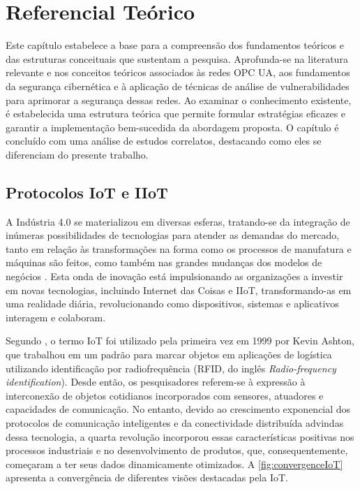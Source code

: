 \chapter{Referencial Teórico} \label{cap:refTeorico}

Este capítulo estabelece a base para a compreensão dos fundamentos teóricos e das estruturas conceituais que sustentam a pesquisa. Aprofunda-se na literatura relevante e nos conceitos teóricos associados às redes OPC UA, aos fundamentos da segurança cibernética e à aplicação de técnicas de análise de vulnerabilidades para aprimorar a segurança dessas redes. Ao examinar o conhecimento existente, é estabelecida uma estrutura teórica que permite formular estratégias eficazes e garantir a implementação bem-sucedida da abordagem proposta. O capítulo é concluído com uma análise de estudos correlatos, destacando como eles se diferenciam do presente trabalho.    

\section{Protocolos IoT e IIoT} \label{sec:protocolos}
    
    A Indústria 4.0 se materializou em diversas esferas, tratando-se da integração de inúmeras possibilidades de tecnologias para atender as demandas do mercado, tanto em relação às transformações na forma como os processos de manufatura e máquinas são feitos, como também nas grandes mudanças dos modelos de negócios \cite{trotta2018}. Esta onda de inovação está impulsionando as organizações a investir em novas tecnologias, incluindo Internet das Coisas e IIoT, transformando-as em uma realidade diária, revolucionando como dispositivos, sistemas e aplicativos interagem e colaboram.
    
    Segundo , o termo IoT foi utilizado pela primeira vez em 1999 por Kevin Ashton, que trabalhou em um padrão para marcar objetos em aplicações de logística utilizando identificação por radiofrequência (RFID, do inglês \textit{Radio-frequency identification}). Desde então, os pesquisadores referem-se à expressão à interconexão de objetos cotidianos incorporados com sensores, atuadores e capacidades de comunicação. No entanto, devido ao crescimento exponencial dos protocolos de comunicação inteligentes e da conectividade distribuída advindas dessa tecnologia, a quarta revolução incorporou essas características positivas nos processos industriais e no desenvolvimento de produtos, que, consequentemente, começaram a ter seus dados dinamicamente otimizados. A \autoref{fig:convergenceIoT} apresenta a convergência de diferentes visões destacadas pela IoT.

